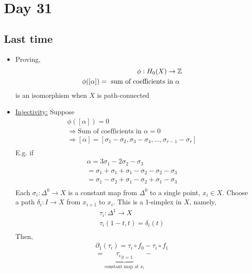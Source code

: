 \documentclass[../notes.tex]{subfiles}
\begin{document}
\section{Day 31}
\subsection{Last time}
\begin{itemize}
    \item Proving,
        \begin{align*}
            \phi: H_0(X)\rightarrow \mathbb{Z}\\
            \phi([\alpha])=\text{ sum of coefficients in $\alpha$ }\\
        \end{align*}
        is an isomorphism when $X$ is path-connected
    \item \underline{Injectivity:} Suppose
        \begin{align*}
            \phi([\alpha])=0\\
            \Rightarrow \text{Sum of coefficients in $\alpha$}=0\\
            \Rightarrow [\alpha]=[\sigma_1-\sigma_2, \sigma_3-\sigma_4,\dots,
                                  \sigma_{r-1}-\sigma_r]\\
        \end{align*}
        E.g. if
        \begin{align*}
            \alpha=3\sigma_1-2\sigma_2-\sigma_3\\
            =\sigma_1+\sigma_1+\sigma_1-\sigma_2-\sigma_2-\sigma_3\\
            =\sigma_1-\sigma_2+\sigma_1-\sigma_2+\sigma_1-\sigma_3\\
        \end{align*}
        Each $\sigma_i:\Delta^0\rightarrow X$ is a constant map from $\Delta^0$ to
        a single point, $x_i\in X$. Choose a path $\delta_i:I\rightarrow X$ from
        $x_{i+1}$ to $x_i$. This is a 1-simplex in $X$, namely,
        \begin{align*}
            \tau_i:\Delta^1\rightarrow X\\
            \tau_i(1-t,t)=\delta_i(t)\\
        \end{align*}
        Then,
        \begin{align*}
            \partial_1(\tau_i)=\tau_i\circ f_0-\tau_i\circ f_1\\
            =\underbrace{{\tau_i}_{|t=1}}_{\text{constant map at $x_i$}}-

\end{align*}
\end{itemize}
\end{document}
